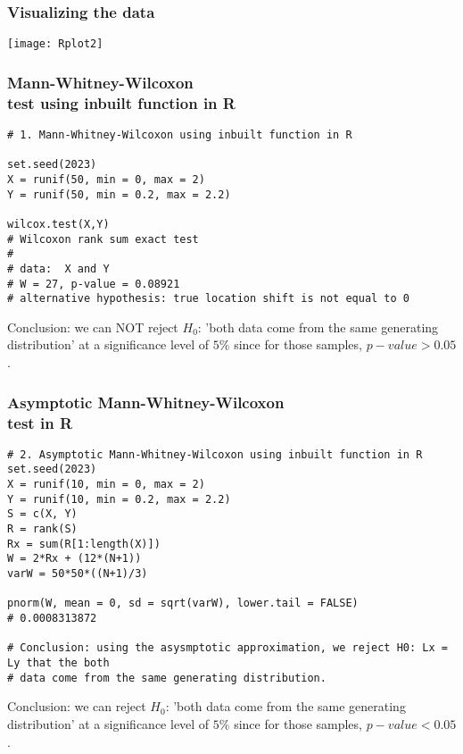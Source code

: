 \documentclass[border=5mm, convert, usenames, dvipsnames,beamer]{standalone}
\begin{document}
\begin{frame}[ fragile]{}
\frametitle{Visualizing the data}

\vspace{50}
\noindent

 \texttt{[image: Rplot2]}


\end{frame}





\begin{frame}[ fragile]{}

\frametitle{Mann-Whitney-Wilcoxon \\ test using inbuilt function in R}

\vspace{30}
\noindent


\begin{lstlisting}[style=
R]
# 1. Mann-Whitney-Wilcoxon using inbuilt function in R

set.seed(2023)
X = runif(50, min = 0, max = 2)
Y = runif(50, min = 0.2, max = 2.2)

wilcox.test(X,Y) 
# Wilcoxon rank sum exact test
# 
# data:  X and Y
# W = 27, p-value = 0.08921
# alternative hypothesis: true location shift is not equal to 0
\end{lstlisting}

\vspace{5}
\noindent
Conclusion: we can NOT reject $H_{0}$: 'both data come from the same generating distribution' at a significance level of $5\%$ since for those samples, $p-value > 0.05$.



\end{frame}




\begin{frame}[ fragile]{}

\frametitle{Asymptotic Mann-Whitney-Wilcoxon \\ 
 test in R}

\vspace{30}
\noindent


\begin{lstlisting}[style=
R]
# 2. Asymptotic Mann-Whitney-Wilcoxon using inbuilt function in R
set.seed(2023)
X = runif(10, min = 0, max = 2)
Y = runif(10, min = 0.2, max = 2.2)
S = c(X, Y)
R = rank(S)
Rx = sum(R[1:length(X)])
W = 2*Rx + (12*(N+1))
varW = 50*50*((N+1)/3)

pnorm(W, mean = 0, sd = sqrt(varW), lower.tail = FALSE) 
# 0.0008313872

# Conclusion: using the asysmptotic approximation, we reject H0: Lx = Ly that the both
# data come from the same generating distribution.
\end{lstlisting}

\vspace{5}
\noindent
Conclusion: we can reject $H_{0}$: 'both data come from the same generating distribution' at a significance level of $5\%$ since for those samples, $p-value < 0.05$.


\end{frame}
\end{document}

